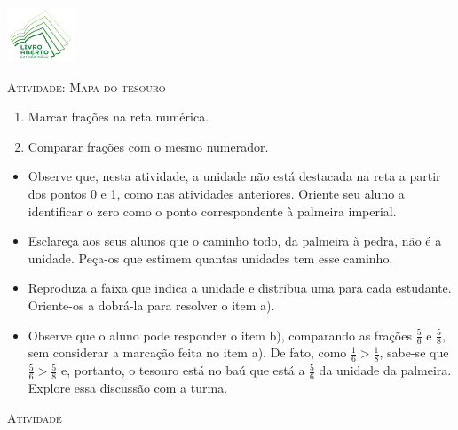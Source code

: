 \documentclass[10 pt,usenames,dvipsnames, oneside]{article}
\begin{document}
\begin{center}
  \begin{minipage}[l]{3cm}
\includegraphics[width=2cm]{../../../Figuras/logo}       
\end{minipage}\hfill
\begin{minipage}[r]{.8\textwidth}
 {\Large \scshape Atividade: Mapa do tesouro}  
\end{minipage}
\end{center}
\vspace{.2cm}

\ifdefined\prof
\begin{goals}
\begin{enumerate}
\item Marcar frações na reta numérica.
\item Comparar frações com o mesmo numerador.
\end{enumerate}

\tcblower

\begin{itemize}
\item Observe que, nesta atividade, a unidade não está destacada na reta a partir dos pontos 0 e 1, como nas atividades anteriores. Oriente seu aluno a identificar o zero como o ponto correspondente à palmeira imperial.
\item Esclareça aos seus alunos que o caminho todo, da palmeira à pedra, não é a unidade. Peça-os que estimem quantas unidades tem esse caminho.
\item Reproduza a faixa que indica a unidade e distribua uma para cada estudante. Oriente-os a dobrá-la para resolver o item a).
\item Observe que o aluno pode responder o item b), comparando as frações $\frac{5}{6}$ e $\frac{5}{8}$, sem considerar a marcação feita no item a). De fato, como $\frac{1}{6} > \frac{1}{8}$, sabe-se que $\frac{5}{6} > \frac{5}{8}$ e, portanto, o tesouro está no baú que está a $\frac{5}{6}$ da unidade da palmeira.
Explore essa discussão com a turma.
\end{itemize}
\end{goals}

\bigskip
\begin{center}
{\large \scshape Atividade}
\end{center}
\fi
\end{document}
